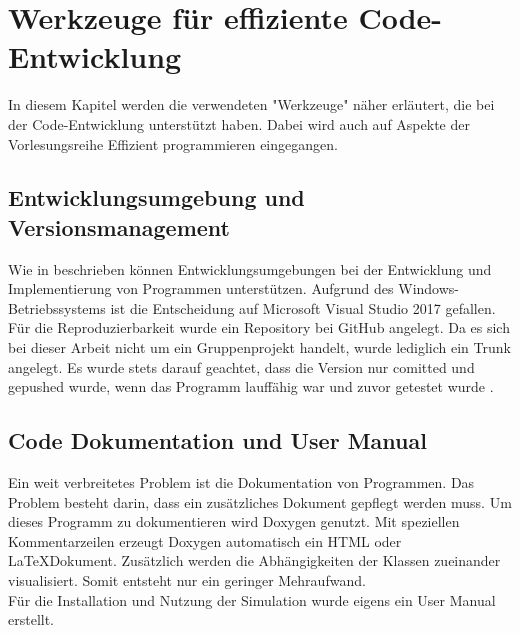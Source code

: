 \chapter{Werkzeuge für effiziente Code-Entwicklung}
In diesem Kapitel werden die verwendeten "Werkzeuge" näher erläutert, die bei der Code-Entwicklung unterstützt haben. Dabei wird auch auf Aspekte der Vorlesungsreihe Effizient programmieren \cite{Kessler.Sommersemester2017} eingegangen.

\section{Entwicklungsumgebung und Versionsmanagement}
Wie in \cite{Kessler.Sommersemester2017} beschrieben können Entwicklungsumgebungen bei der Entwicklung und Implementierung von Programmen unterstützen. Aufgrund des Windows-Betriebssystems ist die Entscheidung auf  Microsoft Visual Studio 2017 gefallen. Für die Reproduzierbarkeit wurde ein Repository bei GitHub angelegt. Da es sich bei dieser Arbeit nicht um ein Gruppenprojekt handelt, wurde lediglich ein Trunk angelegt. Es wurde stets darauf geachtet, dass die Version nur comitted und gepushed wurde, wenn das Programm lauffähig war und zuvor getestet wurde \cite{Kessler.Sommersemester2017}.  
\section{Code Dokumentation und User Manual}
Ein weit verbreitetes Problem ist die Dokumentation von Programmen. Das Problem besteht darin, dass ein zusätzliches Dokument gepflegt werden muss. Um dieses Programm zu dokumentieren wird Doxygen genutzt. Mit speziellen Kommentarzeilen erzeugt Doxygen automatisch ein HTML oder \LaTeX Dokument. Zusätzlich werden die Abhängigkeiten der Klassen zueinander visualisiert. Somit entsteht nur ein geringer Mehraufwand. \\
Für die Installation und Nutzung der Simulation wurde eigens ein User Manual erstellt.
\newpage
